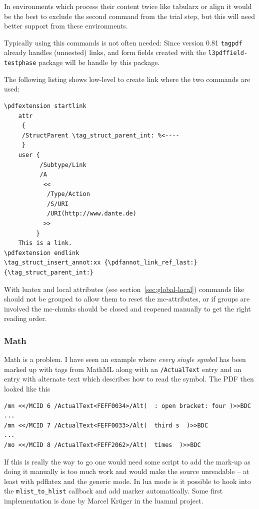 \documentclass[DIV=12,parskip=half-,bibliography=totoc]{scrartcl}
\newcommand\pkg[1]{\texttt{#1}}
\newcommand\PDF{PDF}
\begin{document}
In environments which process their content twice like tabularx or align it would be the
best to exclude the second command from the trial step, but this will need better support from these environments.

Typically using this commands is not often needed: Since version 0.81
\pkg{tagpdf} already handles (unnested) links, and form fields created with
the \pkg{l3pdffield-testphase} package will be handle by this package.

The following listing shows low-level to create link where the two commands are used:


\begin{lstlisting}
\pdfextension startlink
    attr
     {
     /StructParent \tag_struct_parent_int: %<----
     }
    user {
          /Subtype/Link
          /A
           <<
            /Type/Action
            /S/URI
            /URI(http://www.dante.de)
           >>
         }
    This is a link.
\pdfextension endlink
\tag_struct_insert_annot:xx {\pdfannot_link_ref_last:}{\tag_struct_parent_int:}
\end{lstlisting}


With luatex and local attributes (see section~\ref{sec:global-local}) commands like  should not be grouped to allow them to reset the mc-attributes, or if groups are involved the mc-chunks should be closed and reopened manually to get the right reading order.


\subsubsection{Math}



Math is a problem. I have seen an example where \emph{every single symbol} has been marked up with tags from MathML along with an \texttt{/ActualText} entry and an entry with alternate text which describes how to read the symbol.
The \PDF{} then looked like this


\begin{lstlisting}
/mn <</MCID 6 /ActualText<FEFF0034>/Alt(  : open bracket: four )>>BDC
...
/mn <</MCID 7 /ActualText<FEFF0033>/Alt(  third s  )>>BDC
...
/mo <</MCID 8 /ActualText<FEFF2062>/Alt(  times  )>>BDC
\end{lstlisting}


If this is really the way to go one would need some script to add the mark-up as doing it manually is too much work and would make the source unreadable -- at least with pdflatex and the generic mode. In lua mode is it possible to hook into the \texttt{mlist\_to\_hlist} callback and add marker automatically. Some first implementation is done by Marcel Krüger in the luamml project.
\end{document}
